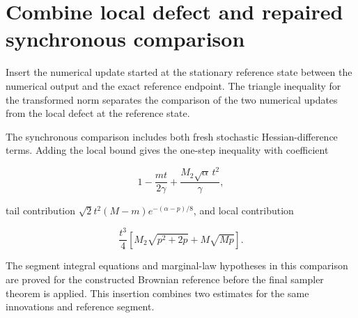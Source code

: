 \documentclass[11pt,a4paper]{article}
\begin{document}
\section{\texorpdfstring{Combine local defect and repaired synchronous comparison}{Combine local defect and repaired synchronous comparison}}


Insert the numerical update started at the stationary reference state between the numerical output and the exact reference endpoint. The triangle inequality for the transformed norm separates the comparison of the two numerical updates from the local defect at the reference state.



The synchronous comparison includes both fresh stochastic Hessian-difference terms. Adding the local bound gives the one-step inequality with coefficient

\[1-\frac{mt}{2\gamma}+\frac{M_2\sqrt\alpha\,t^2}{\gamma},\]

tail contribution \(\sqrt2t^2(M-m)e^{-(\alpha-p)/8}\), and local contribution

\[\frac{t^3}{4}\left[M_2\sqrt{p^2+2p}+M\sqrt{Mp}\right].\]

The segment integral equations and marginal-law hypotheses in this comparison are proved for the constructed Brownian reference before the final sampler theorem is applied. This insertion combines two estimates for the same innovations and reference segment.
\end{document}
